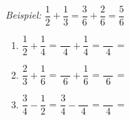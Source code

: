 \begin{enumerate}[label=\arabic*.]
    \textit{Beispiel:} $\dfrac{1}{2} + \dfrac{1}{3} = \dfrac{3}{6} + \dfrac{2}{6} = \dfrac{5}{6}$

    \vspace{0.5cm}
    \begin{enumerate}[label=\alph*)]
        \item $\dfrac{1}{2} + \dfrac{1}{4}$ = $\dfrac{\phantom{00}}{4} + \dfrac{1}{4}$ = $\dfrac{\phantom{00}}{4}$ = \underline{\hspace{3cm}}

        \vspace{0.5cm}
        \item $\dfrac{2}{3} + \dfrac{1}{6}$ = $\dfrac{\phantom{00}}{6} + \dfrac{1}{6}$ = $\dfrac{\phantom{00}}{6}$ = \underline{\hspace{3cm}}

        \vspace{0.5cm}
        \item $\dfrac{3}{4} - \dfrac{1}{2}$ = $\dfrac{3}{4} - \dfrac{\phantom{00}}{4}$ = $\dfrac{\phantom{00}}{4}$ = \underline{\hspace{3cm}}
    \end{enumerate}
\end{enumerate}